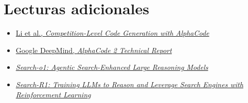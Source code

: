 \section{Lecturas adicionales}

\begin{itemize}
    \item \href{https://arxiv.org/abs/2203.07814}{Li et al., \emph{Competition-Level Code Generation with AlphaCode}}
    \item \href{https://storage.googleapis.com/deepmind-media/AlphaCode2/AlphaCode2_Tech_Report.pdf}{Google DeepMind, \emph{AlphaCode 2 Technical Report}}
    \item \href{https://arxiv.org/search/?query=Search-o1%3A+Agentic+Search-Enhanced+Large+Reasoning+Models\&searchtype=all}{\emph{Search-o1: Agentic Search-Enhanced Large Reasoning Models}}
    \item \href{https://arxiv.org/search/?query=Search-R1\&searchtype=all}{\emph{Search-R1: Training LLMs to Reason and Leverage Search Engines with Reinforcement Learning}}
\end{itemize}

